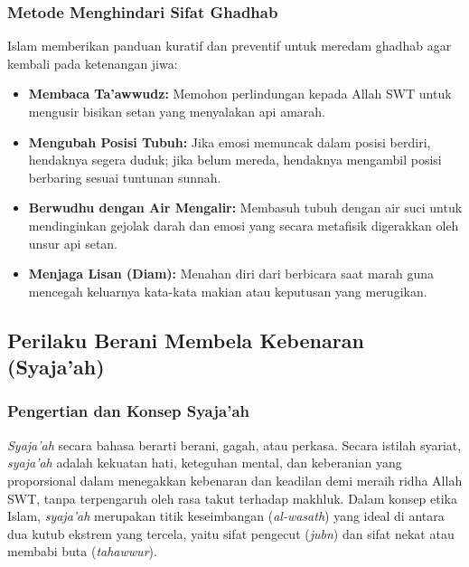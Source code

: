 \documentclass[12pt, a4paper]{article}
\begin{document}
\subsubsection{Metode Menghindari Sifat Ghadhab}
Islam memberikan panduan kuratif dan preventif untuk meredam ghadhab agar kembali pada ketenangan jiwa:
\begin{itemize}
    \item \textbf{Membaca Ta'awwudz:} Memohon perlindungan kepada Allah SWT untuk mengusir bisikan setan yang menyalakan api amarah.
    \item \textbf{Mengubah Posisi Tubuh:} Jika emosi memuncak dalam posisi berdiri, hendaknya segera duduk; jika belum mereda, hendaknya mengambil posisi berbaring sesuai tuntunan sunnah.
    \item \textbf{Berwudhu dengan Air Mengalir:} Membasuh tubuh dengan air suci untuk mendinginkan gejolak darah dan emosi yang secara metafisik digerakkan oleh unsur api setan.
    \item \textbf{Menjaga Lisan (Diam):} Menahan diri dari berbicara saat marah guna mencegah keluarnya kata-kata makian atau keputusan yang merugikan.
\end{itemize}

\subsection{Perilaku Berani Membela Kebenaran (Syaja'ah)}

\subsubsection{Pengertian dan Konsep Syaja'ah}
\textit{Syaja'ah} secara bahasa berarti berani, gagah, atau perkasa. Secara istilah syariat, \textit{syaja'ah} adalah kekuatan hati, keteguhan mental, dan keberanian yang proporsional dalam menegakkan kebenaran dan keadilan demi meraih ridha Allah SWT, tanpa terpengaruh oleh rasa takut terhadap makhluk. Dalam konsep etika Islam, \textit{syaja'ah} merupakan titik keseimbangan (\textit{al-wasath}) yang ideal di antara dua kutub ekstrem yang tercela, yaitu sifat pengecut (\textit{jubn}) dan sifat nekat atau membabi buta (\textit{tahawwur}).
\end{document}
